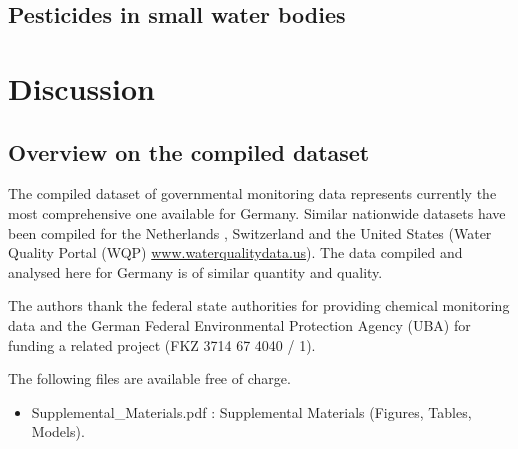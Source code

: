 \documentclass[journal=esthag,manuscript=article]{achemso}
\begin{document}
\subsection{Pesticides in small water bodies}






\section{Discussion}
\subsection{Overview on the compiled dataset}
The compiled dataset of governmental monitoring data represents currently the most comprehensive one available for Germany.
Similar nationwide datasets have been compiled for the Netherlands \citep{vijver_spatial_2008}, Switzerland \citep{munz_pestizidmessungen_2011} and the United States (Water Quality Portal (WQP) \url{www.waterqualitydata.us}).
The data compiled and analysed here for Germany is of similar quantity and quality.










\begin{acknowledgement}
The authors thank the federal state authorities for providing chemical monitoring data and the German Federal Environmental Protection Agency (UBA) for funding a related project (FKZ 3714 67 4040 / 1). 
\end{acknowledgement}



\begin{suppinfo}
The following files are available free of charge.
\begin{itemize}
  \item Supplemental\_Materials.pdf : Supplemental Materials (Figures, Tables, Models).
\end{itemize}
\end{suppinfo}



\end{document}
